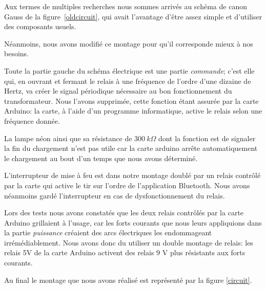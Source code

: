 Aux termes de multiples recherches nous sommes arrivés au
schéma de canon Gauss de la figure~\ref{oldcircuit}, qui avait l'avantage d'être assez
simple et d'utiliser des composants usuels.



Néanmoins, nous avons modifié ce montage pour qu'il corresponde
mieux à nos besoins.

Toute la partie gauche du schéma électrique est une partie
\emph{commande}; c'est elle qui, en ouvrant et fermant le
relais à une fréquence de l'ordre d'une dizaine de Hertz, va
créer le signal périodique nécessaire au bon fonctionnement du
transformateur. Nous l'avons supprimée, cette fonction étant
assurée par la carte Arduino: la carte, à l'aide d'un
programme informatique, active le relais selon une fréquence
donnée.

La lampe néon ainsi que sa résistance de $300\ k\Omega$ dont la
fonction est de signaler la fin du chargement n'est pas utile
car la carte arduino arrête automatiquement le chargement au
bout d'un temps que nous avons déterminé.

L'interrupteur de mise à feu est dans notre montage doublé par
un relais contrôlé par la carte qui active le tir sur l'ordre
de l'application Bluetooth. Nous avons néanmoins gardé
l'interrupteur en cas de dysfonctionnement du relais.

Lors des tests nous avons constatés que les deux relais
contrôlés par la carte Arduino grillaient à l'usage, car les
forts courants que nous leurs appliquions dans la partie
\emph{puissance} créaient des arcs électriques les endommageant
irrémédiablement. Nous avons donc du utiliser un double montage
de relais: les relais 5V de la carte Arduino activent des
relais 9 V plus résistants aux forts courants.

Au final le montage que nous avons réalisé est représenté par la figure \ref{circuit}.



